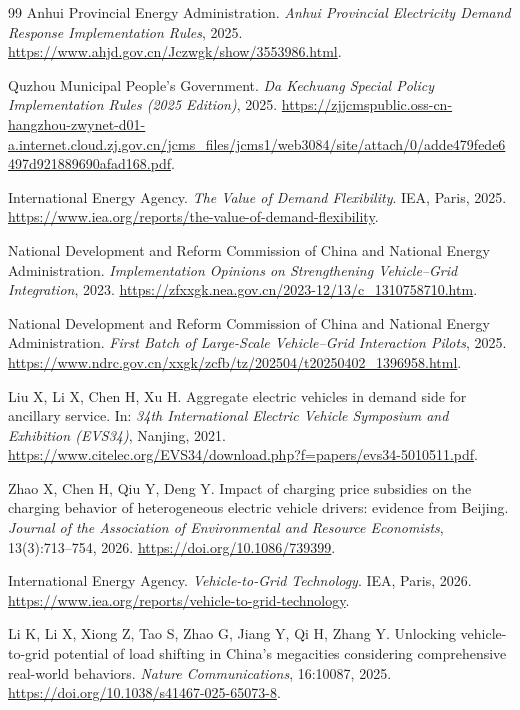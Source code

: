 \begin{thebibliography}{99}
Anhui Provincial Energy Administration.
\newblock \emph{Anhui Provincial Electricity Demand Response Implementation
Rules}, 2025.
\newblock \url{https://www.ahjd.gov.cn/Jczwgk/show/3553986.html}.

Quzhou Municipal People's Government.
\newblock \emph{Da Kechuang Special Policy Implementation Rules
(2025 Edition)}, 2025.
\newblock \url{https://zjjcmspublic.oss-cn-hangzhou-zwynet-d01-a.internet.cloud.zj.gov.cn/jcms_files/jcms1/web3084/site/attach/0/adde479fede6497d921889690afad168.pdf}.

International Energy Agency.
\newblock \emph{The Value of Demand Flexibility}.
\newblock IEA, Paris, 2025.
\newblock \url{https://www.iea.org/reports/the-value-of-demand-flexibility}.

National Development and Reform Commission of China and National Energy
Administration.
\newblock \emph{Implementation Opinions on Strengthening Vehicle--Grid
Integration}, 2023.
\newblock \url{https://zfxxgk.nea.gov.cn/2023-12/13/c_1310758710.htm}.

National Development and Reform Commission of China and National Energy
Administration.
\newblock \emph{First Batch of Large-Scale Vehicle--Grid Interaction Pilots},
2025.
\newblock \url{https://www.ndrc.gov.cn/xxgk/zcfb/tz/202504/t20250402_1396958.html}.

Liu X, Li X, Chen H, Xu H.
\newblock Aggregate electric vehicles in demand side for ancillary service.
\newblock In: \emph{34th International Electric Vehicle Symposium and
Exhibition (EVS34)}, Nanjing, 2021.
\newblock \url{https://www.citelec.org/EVS34/download.php?f=papers/evs34-5010511.pdf}.

Zhao X, Chen H, Qiu Y, Deng Y.
\newblock Impact of charging price subsidies on the charging behavior of
heterogeneous electric vehicle drivers: evidence from Beijing.
\newblock \emph{Journal of the Association of Environmental and Resource
Economists}, 13(3):713--754, 2026.
\newblock \url{https://doi.org/10.1086/739399}.

International Energy Agency.
\newblock \emph{Vehicle-to-Grid Technology}.
\newblock IEA, Paris, 2026.
\newblock \url{https://www.iea.org/reports/vehicle-to-grid-technology}.

Li K, Li X, Xiong Z, Tao S, Zhao G, Jiang Y, Qi H, Zhang Y.
\newblock Unlocking vehicle-to-grid potential of load shifting in China's
megacities considering comprehensive real-world behaviors.
\newblock \emph{Nature Communications}, 16:10087, 2025.
\newblock \url{https://doi.org/10.1038/s41467-025-65073-8}.


\end{thebibliography}
